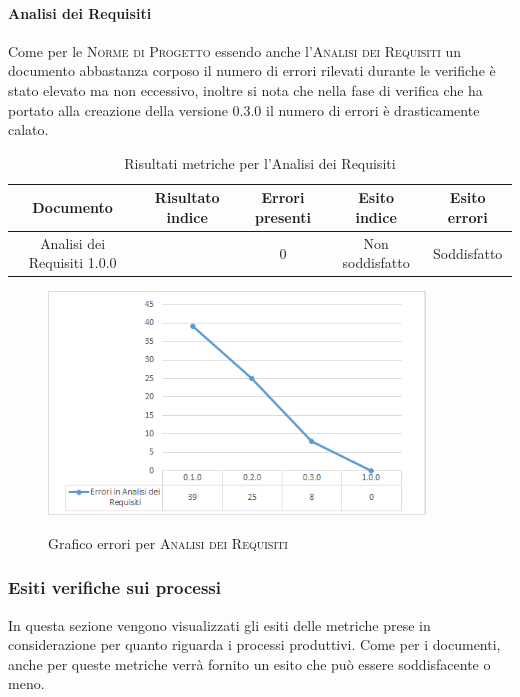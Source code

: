 \documentclass[../piano-di-qualifica.tex]{subfiles}
\begin{document}
\paragraph{Analisi dei Requisiti}
\label{sub:analisi_dei_requisiti}
Come per le \textsc{Norme di Progetto} essendo anche l'\textsc{Analisi dei Requisiti} un documento abbastanza corposo il numero di errori rilevati durante le verifiche è stato elevato ma non eccessivo, inoltre si nota che nella fase di verifica che ha portato alla creazione della versione 0.3.0 il numero di errori è drasticamente calato. 

\begin{table}[H]
    \centering
    \begin{tabular}{ccccc}
    \hline
    Documento                   & Risultato indice & Errori presenti & Esito indice    & Esito errori \\ \hline
    Analisi dei Requisiti 1.0.0 &                  & 0               & Non soddisfatto & Soddisfatto 
    \end{tabular}
    \caption{Risultati metriche per l'Analisi dei Requisiti}
    \label{tab:my-table}
\end{table}

    \begin{figure}[H]
        \centering
        \includegraphics[width=10cm]{img/erroriAnalisi.png}
        \label{fig:scice_documenti}
        \caption{Grafico errori per \textsc{Analisi dei Requisiti}}
    \end{figure}

\subsubsection{Esiti verifiche sui processi}
\label{sub:esiti_verifiche_sui_processi}
In questa sezione vengono visualizzati gli esiti delle metriche prese in considerazione per quanto riguarda i processi produttivi.
Come per i documenti, anche per queste metriche verrà fornito un esito che può essere soddisfacente o meno.
\end{document}
